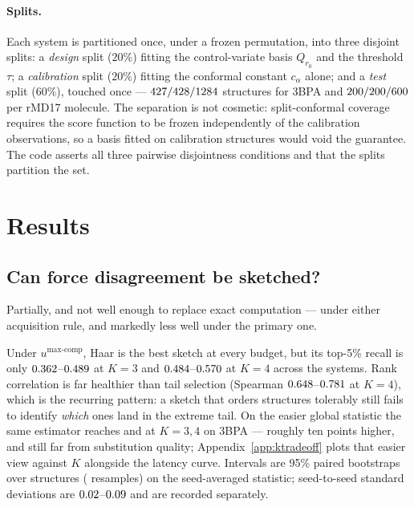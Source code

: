 \documentclass{article}
\begin{document}
\paragraph{Splits.}
Each system is partitioned once, under a frozen permutation, into three disjoint splits: a
\emph{design} split ($20\%$) fitting the control-variate basis $Q_{r_0}$ and the threshold $\tau$; a
\emph{calibration} split ($20\%$) fitting the conformal constant $c_\alpha$ alone; and a \emph{test}
split ($60\%$), touched once --- $427/428/1284$ structures for
3BPA and $200/200/600$ per rMD17 molecule. The separation is not
cosmetic: split-conformal coverage requires the score function to be frozen independently of the
calibration observations, so a basis fitted on calibration structures would void the guarantee. The
code asserts all three pairwise disjointness conditions and that the splits partition the set.

\section{Results}

\subsection{Can force disagreement be sketched?}
\label{sec:fidelity}
Partially, and not well enough to replace exact computation --- under either acquisition rule, and
markedly less well under the primary one.

Under $u^{\max\text{-comp}}$, Haar is the best sketch at every budget, but its top-5\% recall is only
$0.362$--$0.489$ at $K{=}3$ and
$0.484$--$0.570$ at $K{=}4$ across the \fsMaxNSystems{} systems. Rank
correlation is far healthier than tail selection (Spearman
$0.648$--$0.781$ at $K{=}4$), which is the recurring pattern: a
sketch that orders structures tolerably still fails to identify \emph{which} ones land in the
extreme tail. On the easier global statistic the same estimator reaches \fsHaarRecallKThree{}
\fsHaarRecallKThreeCI{} and \fsHaarRecallKFour{} \fsHaarRecallKFourCI{} at $K{=}3,4$ on 3BPA ---
roughly ten points higher, and still far from substitution quality; Appendix~\ref{app:ktradeoff}
plots that easier view against $K$ alongside the latency curve. Intervals are 95\% paired
bootstraps over structures (\fsNBoot{} resamples) on the seed-averaged statistic; seed-to-seed
standard deviations are $0.02$--$0.09$ and are recorded separately.
\end{document}
